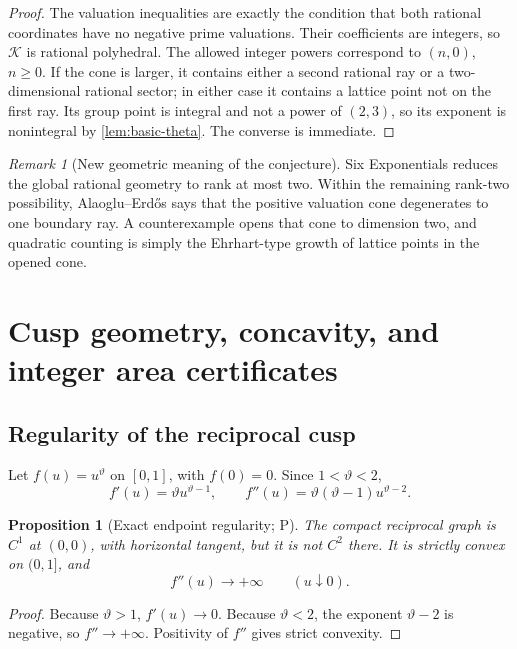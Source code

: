 \documentclass[10pt,oneside]{article}
\newtheorem{proposition}[theorem]{Proposition}
\theoremstyle{definition}
\theoremstyle{remark}
\newtheorem{remark}[theorem]{Remark}
\newcommand{\thetaq}{\vartheta}
\newcommand{\statusP}{\textsc{P}}
\begin{document}
\begin{proof}
The valuation inequalities are exactly the condition that both rational coordinates have no negative prime valuations.  Their coefficients are integers, so \(\mathscr K\) is rational polyhedral.  The allowed integer powers correspond to \((n,0)\), \(n\ge0\).  If the cone is larger, it contains either a second rational ray or a two-dimensional rational sector; in either case it contains a lattice point not on the first ray.  Its group point is integral and not a power of \((2,3)\), so its exponent is nonintegral by \cref{lem:basic-theta}.  The converse is immediate.
\end{proof}

\begin{remark}[New geometric meaning of the conjecture]
Six Exponentials reduces the global rational geometry to rank at most two.  Within the remaining rank-two possibility, Alaoglu--Erd\H{o}s says that the positive valuation cone degenerates to one boundary ray.  A counterexample opens that cone to dimension two, and quadratic counting is simply the Ehrhart-type growth of lattice points in the opened cone.
\end{remark}

\section{Cusp geometry, concavity, and integer area certificates}
\label{sec:cusp-geometry}

\subsection{Regularity of the reciprocal cusp}
Let \(f(u)=u^{\thetaq}\) on \([0,1]\), with \(f(0)=0\).  Since \(1<\thetaq<2\),
\[
 f'(u)=\thetaq u^{\thetaq-1},
 \qquad
 f''(u)=\thetaq(\thetaq-1)u^{\thetaq-2}.
\]

\begin{proposition}[Exact endpoint regularity; \statusP]
\label{prop:cusp-regularity}
The compact reciprocal graph is \(C^1\) at \((0,0)\), with horizontal tangent, but it is not \(C^2\) there.  It is strictly convex on \((0,1]\), and
\[
 f''(u)\longrightarrow+\infty
 \qquad(u\downarrow0).
\]
\end{proposition}

\begin{proof}
Because \(\thetaq>1\), \(f'(u)\to0\).  Because \(\thetaq<2\), the exponent \(\thetaq-2\) is negative, so \(f''\to+\infty\).  Positivity of \(f''\) gives strict convexity.
\end{proof}
\end{document}

